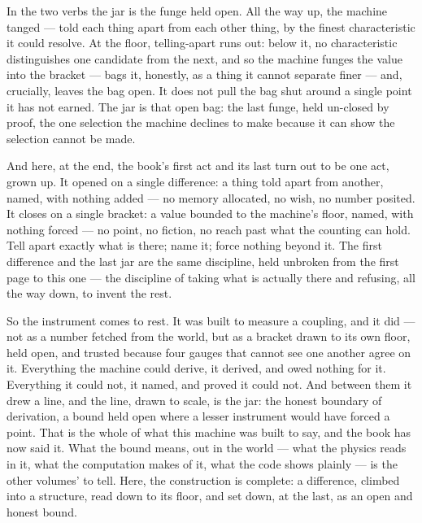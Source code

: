 In the two verbs the jar is the funge held open. All the way up, the machine tanged --- told each thing apart from each
other thing, by the finest characteristic it could resolve. At the floor, telling-apart runs out: below it, no
characteristic distinguishes one candidate from the next, and so the machine funges the value into the bracket --- bags
it, honestly, as a thing it cannot separate finer --- and, crucially, leaves the bag open. It does not pull the bag
shut around a single point it has not earned. The jar is that open bag: the last funge, held un-closed by proof, the
one selection the machine declines to make because it can show the selection cannot be made.

And here, at the end, the book's first act and its last turn out to be one act, grown up. It opened on a single
difference: a thing told apart from another, named, with nothing added --- no memory allocated, no wish, no number
posited. It closes on a single bracket: a value bounded to the machine's floor, named, with nothing forced --- no
point, no fiction, no reach past what the counting can hold. Tell apart exactly what is there; name it; force nothing
beyond it. The first difference and the last jar are the same discipline, held unbroken from the first page to this
one --- the discipline of taking what is actually there and refusing, all the way down, to invent the rest.

So the instrument comes to rest. It was built to measure a coupling, and it did --- not as a number fetched from the
world, but as a bracket drawn to its own floor, held open, and trusted because four gauges that cannot see one another
agree on it. Everything the machine could derive, it derived, and owed nothing for it. Everything it could not, it
named, and proved it could not. And between them it drew a line, and the line, drawn to scale, is the jar: the honest
boundary of derivation, a bound held open where a lesser instrument would have forced a point. That is the whole of
what this machine was built to say, and the book has now said it. What the bound means, out in the world --- what the
physics reads in it, what the computation makes of it, what the code shows plainly --- is the other volumes' to tell.
Here, the construction is complete: a difference, climbed into a structure, read down to its floor, and set down, at
the last, as an open and honest bound.
